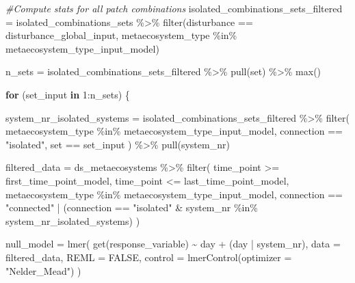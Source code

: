 \documentclass[
]{article}
\newenvironment{Shaded}{\begin{snugshade}}{\end{snugshade}}
\newcommand{\AttributeTok}[1]{\textcolor[rgb]{0.77,0.63,0.00}{#1}}
\newcommand{\CommentTok}[1]{\textcolor[rgb]{0.56,0.35,0.01}{\textit{#1}}}
\newcommand{\ConstantTok}[1]{\textcolor[rgb]{0.00,0.00,0.00}{#1}}
\newcommand{\ControlFlowTok}[1]{\textcolor[rgb]{0.13,0.29,0.53}{\textbf{#1}}}
\newcommand{\DecValTok}[1]{\textcolor[rgb]{0.00,0.00,0.81}{#1}}
\newcommand{\FunctionTok}[1]{\textcolor[rgb]{0.00,0.00,0.00}{#1}}
\newcommand{\NormalTok}[1]{#1}
\newcommand{\OtherTok}[1]{\textcolor[rgb]{0.56,0.35,0.01}{#1}}
\newcommand{\SpecialCharTok}[1]{\textcolor[rgb]{0.00,0.00,0.00}{#1}}
\newcommand{\StringTok}[1]{\textcolor[rgb]{0.31,0.60,0.02}{#1}}
\begin{document}
\begin{Shaded}
\begin{Highlighting}[]
\CommentTok{\#Compute stats for all patch combinations }
\NormalTok{isolated\_combinations\_sets\_filtered }\OtherTok{=}\NormalTok{  isolated\_combinations\_sets }\SpecialCharTok{\%\textgreater{}\%}
  \FunctionTok{filter}\NormalTok{(disturbance }\SpecialCharTok{==}\NormalTok{ disturbance\_global\_input,}
\NormalTok{         metaecosystem\_type }\SpecialCharTok{\%in\%}\NormalTok{ metaecosystem\_type\_input\_model)}

\NormalTok{n\_sets }\OtherTok{=}\NormalTok{ isolated\_combinations\_sets\_filtered }\SpecialCharTok{\%\textgreater{}\%}
  \FunctionTok{pull}\NormalTok{(set) }\SpecialCharTok{\%\textgreater{}\%}
  \FunctionTok{max}\NormalTok{()}

\ControlFlowTok{for}\NormalTok{ (set\_input }\ControlFlowTok{in} \DecValTok{1}\SpecialCharTok{:}\NormalTok{n\_sets) \{}
  
\NormalTok{  system\_nr\_isolated\_systems }\OtherTok{=}\NormalTok{ isolated\_combinations\_sets\_filtered }\SpecialCharTok{\%\textgreater{}\%}
    \FunctionTok{filter}\NormalTok{(}
\NormalTok{      metaecosystem\_type }\SpecialCharTok{\%in\%}\NormalTok{ metaecosystem\_type\_input\_model,}
\NormalTok{      connection }\SpecialCharTok{==} \StringTok{"isolated"}\NormalTok{,}
\NormalTok{      set }\SpecialCharTok{==}\NormalTok{ set\_input}
\NormalTok{    ) }\SpecialCharTok{\%\textgreater{}\%}
    \FunctionTok{pull}\NormalTok{(system\_nr)}
  
\NormalTok{  filtered\_data }\OtherTok{=}\NormalTok{ ds\_metaecosystems }\SpecialCharTok{\%\textgreater{}\%}
    \FunctionTok{filter}\NormalTok{(}
\NormalTok{      time\_point }\SpecialCharTok{\textgreater{}=}\NormalTok{ first\_time\_point\_model,}
\NormalTok{      time\_point }\SpecialCharTok{\textless{}=}\NormalTok{ last\_time\_point\_model,}
\NormalTok{      metaecosystem\_type }\SpecialCharTok{\%in\%}\NormalTok{ metaecosystem\_type\_input\_model,}
\NormalTok{      connection }\SpecialCharTok{==} \StringTok{"connected"} \SpecialCharTok{|}
\NormalTok{        (connection }\SpecialCharTok{==} \StringTok{"isolated"} \SpecialCharTok{\&}
\NormalTok{           system\_nr }\SpecialCharTok{\%in\%}\NormalTok{ system\_nr\_isolated\_systems)}
\NormalTok{    )}
  
\NormalTok{  null\_model }\OtherTok{=} \FunctionTok{lmer}\NormalTok{(}
    \FunctionTok{get}\NormalTok{(response\_variable) }\SpecialCharTok{\textasciitilde{}}
\NormalTok{      day }\SpecialCharTok{+}
\NormalTok{      (day }\SpecialCharTok{|}\NormalTok{ system\_nr),}
    \AttributeTok{data =}\NormalTok{ filtered\_data,}
    \AttributeTok{REML =} \ConstantTok{FALSE}\NormalTok{,}
    \AttributeTok{control =} \FunctionTok{lmerControl}\NormalTok{(}\AttributeTok{optimizer =} \StringTok{"Nelder\_Mead"}\NormalTok{)}
\NormalTok{  )}
  

\end{Highlighting}
\end{Shaded}
\end{document}
